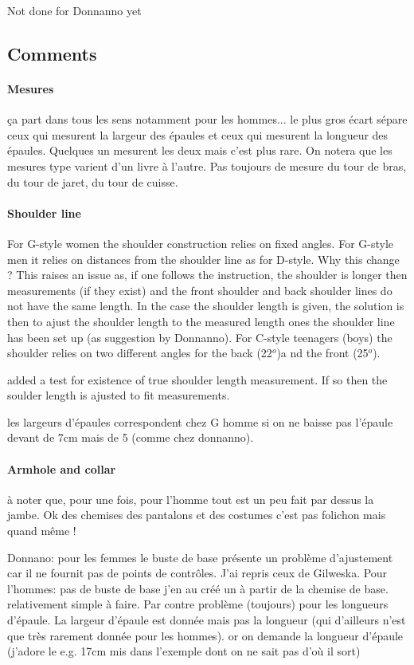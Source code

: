 \documentclass[11pt,a4paper]{article}
\begin{document}
Not done for Donnanno yet

\subsection{Comments}

\paragraph{Mesures}
ça part dans tous les sens notamment pour les hommes... le plus gros écart sépare ceux qui mesurent la largeur des épaules et ceux qui mesurent la longueur des épaules. Quelques un mesurent les deux mais c'est plus rare. On notera que les mesures type varient d'un livre à l'autre. Pas toujours de mesure du tour de bras, du tour de jaret, du tour de cuisse.

\paragraph{Shoulder line} 

For G-style women the shoulder construction relies on fixed angles. For G-style men it relies on distances from the shoulder line as for D-style. Why  this change ? This raises an issue as, if one follows the instruction, the shoulder is longer then measurements (if they exist) and the front shoulder and back shoulder lines do not have the same length. In the case the shoulder length is given, the solution is then to ajust the shoulder length to the measured length ones the shoulder line has been set up (as suggestion by Donnanno).
For C-style teenagers (boys) the shoulder relies on two different angles for the back (22$^o$)a nd the front (25$^o$). 

added a test for existence of true shoulder length measurement. If so then the soulder length is ajusted to fit measurements.

les largeurs d'épaules correspondent chez G homme si on ne baisse pas l'épaule devant de 7cm mais de 5 (comme chez donnanno).

\paragraph{Armhole and collar}

à noter que, pour une fois, pour l'homme tout est un peu fait par dessus 
la jambe. Ok des chemises des pantalons et des costumes c'est pas 
folichon mais quand même !

Donnano:  pour les femmes le buste de base présente un problème d'ajustement car il ne 
fournit pas de points de contrôles. J'ai repris ceux de Gilweska. 
Pour l'hommes: pas de buste de base j'en au  créé un à partir de la chemise de base. 
relativement simple à faire. Par contre problème (toujours) pour les 
longueurs d'épaule. La largeur d'épaule est donnée mais pas la 
longueur (qui d'ailleurs n'est que très rarement donnée pour les 
hommes). or on demande la longueur d'épaule (j'adore le e.g. 17cm mis 
dans l'exemple dont on ne sait pas d'où il sort) 
\end{document}
